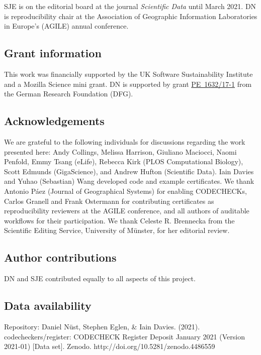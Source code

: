 \documentclass[12pt]{article}
\begin{document}
SJE is on the editorial board at the journal \emph{Scientific Data}
until March 2021.  DN is reproducibility chair at the Association of
Geographic Information Laboratories in Europe's (AGILE) annual
conference.

\subsection*{Grant information}

This work was financially supported by the UK Software
Sustainability Institute and a Mozilla Science mini grant.
DN is supported by grant
\href{https://gepris.dfg.de/gepris/projekt/415851837}{PE~1632/17-1}
from the German Research Foundation (DFG).

\subsection*{Acknowledgements}\label{acknowledgements}


We are grateful to the following individuals for discussions regarding
the work presented here: Andy Collings, Melissa Harrison, Giuliano
Maciocci, Naomi Penfold, Emmy Tsang (eLife), Rebecca Kirk (PLOS
Computational Biology), Scott Edmunds (GigaScience), and Andrew Hufton
(Scientific Data). Iain Davies and Yuhao (Sebastian) Wang developed
code and example certificates.  We thank Antonio P\'{a}ez (Journal of
Geographical Systems) for enabling CODECHECKs, Carlos Granell and
Frank Ostermann for contributing certificates as reproducibility
reviewers at the AGILE conference, and all authors of auditable
workflows for their participation.  We thank Celeste R. Brennecka from
the Scientific Editing Service, University of M\"unster, for her
editorial review.

\subsection*{Author contributions}

DN and SJE contributed equally to all aspects of this project.

\subsection{Data availability}

Repository: Daniel Nüst, Stephen Eglen, \& Iain Davies. (2021). codecheckers/register: CODECHECK Register Deposit January 2021 (Version 2021-01) [Data set]. Zenodo. http://doi.org/10.5281/zenodo.4486559
\end{document}
